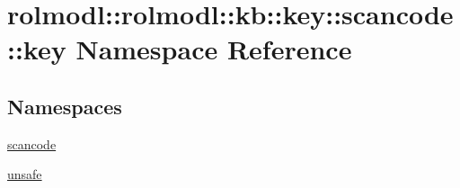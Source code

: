 \hypertarget{namespacerolmodl_1_1rolmodl_1_1kb_1_1key_1_1scancode_1_1key}{}\section{rolmodl\+::rolmodl\+::kb\+::key\+::scancode\+::key Namespace Reference}
\label{namespacerolmodl_1_1rolmodl_1_1kb_1_1key_1_1scancode_1_1key}
\subsection*{Namespaces}
\begin{DoxyCompactItemize}
\item 
 \mbox{\hyperlink{namespacerolmodl_1_1rolmodl_1_1kb_1_1key_1_1scancode_1_1key_1_1scancode}{scancode}}
\item 
 \mbox{\hyperlink{namespacerolmodl_1_1rolmodl_1_1kb_1_1key_1_1scancode_1_1key_1_1unsafe}{unsafe}}
\end{DoxyCompactItemize}
